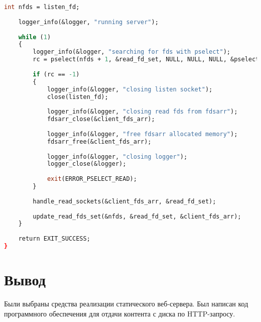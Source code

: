 \begin{lstlisting}[label=server_code,caption=Реализация статического веб-сервера,language=Caml]
	int nfds = listen_fd;
	
	logger_info(&logger, "running server");
	
	while (1)
	{
		logger_info(&logger, "searching for fds with pselect");
		rc = pselect(nfds + 1, &read_fd_set, NULL, NULL, NULL, &pselect_sigmask);
		
		if (rc == -1)
		{
			logger_info(&logger, "closing listen socket");
			close(listen_fd);
			
			logger_info(&logger, "closing read fds from fdsarr");
			fdsarr_close(&client_fds_arr);
			
			logger_info(&logger, "free fdsarr allocated memory");
			fdsarr_free(&client_fds_arr);
			
			logger_info(&logger, "closing logger");
			logger_close(&logger);
			
			exit(ERROR_PSELECT_READ);
		}
		
		handle_read_sockets(&client_fds_arr, &read_fd_set);
		
		update_read_fds_set(&nfds, &read_fd_set, &client_fds_arr);
	}
	
	return EXIT_SUCCESS;
}
\end{lstlisting}

\section*{Вывод}

Были выбраны средства реализации статического веб-сервера.
Был написан код программного обеспечения для отдачи контента с диска по HTTP-запросу.

\clearpage